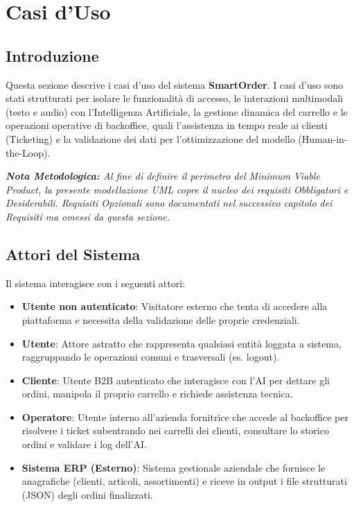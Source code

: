 \documentclass[a4paper, 11pt, oneside]{scrartcl} %
\begin{document}
\newpage
\section{Casi d'Uso}

\subsection{Introduzione}
Questa sezione descrive i casi d'uso del sistema \textbf{SmartOrder}. I casi d'uso sono stati strutturati per isolare le funzionalità di accesso, le interazioni multimodali (testo e audio) con l'Intelligenza Artificiale, la gestione dinamica del carrello e le operazioni operative di backoffice, quali l'assistenza in tempo reale ai clienti (Ticketing) e la validazione dei dati per l'ottimizzazione del modello (Human-in-the-Loop).

\vspace{0.3cm}
\noindent\textit{\textbf{Nota Metodologica:} Al fine di definire il perimetro del Minimum Viable Product, la presente modellazione UML copre il nucleo dei requisiti Obbligatori e Desiderabili. Requisiti Opzionali sono documentati nel successivo capitolo dei Requisiti ma omessi da questa sezione.}

\subsection{Attori del Sistema}
Il sistema interagisce con i seguenti attori:
\begin{itemize}
    \item \textbf{Utente non autenticato}: Visitatore esterno che tenta di accedere alla piattaforma e necessita della validazione delle proprie credenziali.
    \item \textbf{Utente}: Attore astratto che rappresenta qualsiasi entità loggata a sistema, raggruppando le operazioni comuni e trasversali (es. logout).
    \item \textbf{Cliente}: Utente B2B autenticato che interagisce con l'AI per dettare gli ordini, manipola il proprio carrello e richiede assistenza tecnica.
    \item \textbf{Operatore}: Utente interno all'azienda fornitrice che accede al backoffice per risolvere i ticket subentrando nei carrelli dei clienti, consultare lo storico ordini e validare i log dell'AI.
    \item \textbf{Sistema ERP (Esterno)}: Sistema gestionale aziendale che fornisce le anagrafiche (clienti, articoli, assortimenti) e riceve in output i file strutturati (JSON) degli ordini finalizzati.
\end{itemize}






\end{document}
